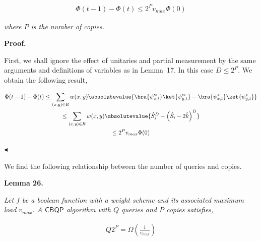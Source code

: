 \[\begin{gathered}
\displaystyle\Phi(t-1)-\Phi(t)\leq 2^{P}v_{max}\Phi(0)
\end{gathered}\]


\emph{where $P$ is the number of copies.}\par






\par\medskip\noindent\textbf{Proof.}\par




First, we shall ignore the effect of unitaries and partial measurement by the same arguments and definitions of variables as in Lemma 17. In this case $D\leq 2^{P}$. We obtain the following result,\par


\[\begin{gathered}
\displaystyle\Phi(t-1)-\Phi(t)\leq \displaystyle\sum_{(x,y)\in R}w(x,y)\absolutevalue{\bra{\psi_{x,t}^{\prime*}}\ket{\psi_{y,t}^{\prime*}}-\bra{\psi_{x,t}^{*}}\ket{\psi_{y,t}^{*}}} \\
\displaystyle\leq \displaystyle\sum_{(x,y)\in R}w(x,y)\absolutevalue{\hat{S}_{i}^{D}-\left(\hat{S}_{i}-2\hat{k}\right)^{D}} \\
\displaystyle\leq \displaystyle 2^{P}v_{max}\Phi(0)
\end{gathered}\]


$\blacktriangleleft$\par




We find the following relationship between the number of queries and copies.\par





\par\medskip\noindent\textbf{
\textbf{Lemma 26}\textbf{.}
}\par



\emph{Let $f$ be a boolean function with a weight scheme and its associated maximum load $v_{max}$. A $\mathsf{CBQP}$ algorithm with $Q$ queries and $P$ copies satisfies,}\par


\[\begin{gathered}
\displaystyle Q2^{P}=\Omega\left(\frac{1}{v_{max}}\right)
\end{gathered}\]



